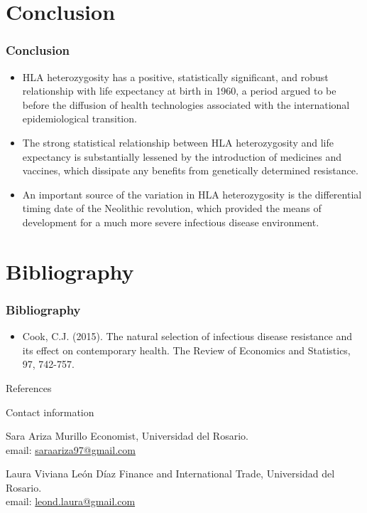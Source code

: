 \documentclass[pdftex,12pt,xcolor=pdftex,table]{beamer}
\theoremstyle{definition}
\theoremstyle{remark}
\numberwithin{equation}{section}
\numberwithin{figure}{section}
\begin{document}
\section{Conclusion}
\begin{frame}
\frametitle{Conclusion}
\begin{itemize}
    \item HLA heterozygosity has a positive, statistically significant, and robust relationship with life expectancy at birth in 1960, a period argued to be before the diffusion of health technologies associated with the international epidemiological transition.
    \pause
    \item The strong statistical relationship between HLA heterozygosity and life expectancy is substantially lessened by the introduction of medicines and vaccines, which dissipate any benefits from genetically determined resistance.
    \pause
    \item An important source of the variation in HLA heterozygosity is the differential timing date of the Neolithic revolution, which provided the means of development for a much more severe infectious disease environment.
    
\end{itemize}
\end{frame}

\section{Bibliography}
\begin{frame}
\frametitle{Bibliography}
\begin{itemize}
    \item 
Cook, C.J. (2015). The natural selection of infectious disease resistance and its effect on contemporary health.  The Review of Economics and Statistics, 97, 742-757.

\end{itemize}
\end{frame}

\begin{frame}{References}
\tiny{
     
  
}
    
\end{frame}

\begin{frame}{Contact information}
    \begin{block}{Sara Ariza Murillo}
    Economist, Universidad del Rosario.\\
    email: \url{saraariza97@gmail.com}
    \end{block}
   \begin{block}{Laura Viviana León Díaz}
    Finance and International Trade, Universidad del Rosario.\\
    email: \url{leond.laura@gmail.com}
    \end{block}      
    
\end{frame}
\end{document}
